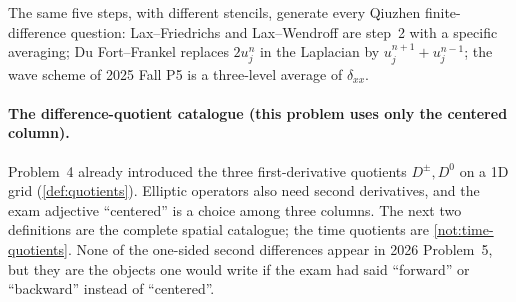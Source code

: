 \documentclass[11pt,a4paper]{article}
\begin{document}
The same five steps, with different stencils, generate every Qiuzhen finite-difference question: Lax--Friedrichs and Lax--Wendroff are step~2 with a specific averaging; Du Fort--Frankel replaces \(2u_j^n\) in the Laplacian by \(u_j^{n+1}+u_j^{n-1}\); the wave scheme of 2025 Fall P5 is a three-level average of \(\delta_{xx}\).

\paragraph{The difference-quotient catalogue (this problem uses only the centered column).}

Problem~4 already introduced the three first-derivative quotients \(D^\pm,D^0\) on a 1D grid (\cref{def:quotients}). Elliptic operators also need second derivatives, and the exam adjective ``centered'' is a choice among three columns. The next two definitions are the complete spatial catalogue; the time quotients are \cref{not:time-quotients}. None of the one-sided second differences appear in 2026 Problem~5, but they are the objects one would write if the exam had said ``forward'' or ``backward'' instead of ``centered''.
\end{document}
